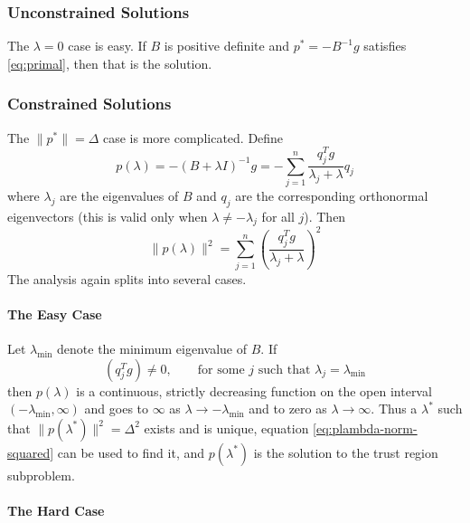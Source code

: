 \documentclass[11pt]{article}
\begin{document}
\subsubsection{Unconstrained Solutions}

The $\lambda = 0$ case is easy.  If $B$ is positive definite and
$p^* = - B^{-1} g$ satisfies \eqref{eq:primal}, then that is the solution.

\subsubsection{Constrained Solutions}

The $\lVert p^* \rVert = \Delta$ case is more complicated.  Define
\begin{equation} \label{eq:plambda}
   p(\lambda)
   =
   - (B + \lambda I)^{-1} g
   =
   - \sum_{j = 1}^{n} \frac{q_j^T g}{\lambda_j + \lambda} q_j
\end{equation}
where $\lambda_j$ are the eigenvalues of $B$ and $q_j$ are the corresponding
orthonormal eigenvectors (this is valid only when $\lambda \neq - \lambda_j$
for all $j$).  Then
\begin{equation} \label{eq:plambda-norm-squared}
   \lVert p(\lambda) \rVert^2
   =
   \sum_{j = 1}^{n} \left( \frac{q_j^T g}{\lambda_j + \lambda} \right)^2
\end{equation}
The analysis again splits into several cases.

\paragraph{The Easy Case}

Let $\lambda_{\text{min}}$ denote the minimum eigenvalue of $B$.
If
\begin{equation} \label{eq:easy-condition}
   (q_j^T g) \neq 0, \qquad \text{for some $j$ such that
   $\lambda_j = \lambda_{\text{min}}$}
\end{equation}
then $p(\lambda)$ is a continuous, strictly decreasing function on
the open interval $(- \lambda_{\text{min}}, \infty)$ and goes to $\infty$
as $\lambda \to - \lambda_{\text{min}}$ and to zero as $\lambda \to \infty$.
Thus a $\lambda^*$
such that $\lVert p(\lambda^*) \rVert^2 = \Delta^2$ exists and is unique,
equation \eqref{eq:plambda-norm-squared} can be used to find it,
and $p(\lambda^*)$ is the
solution to the trust region subproblem.

\paragraph{The Hard Case}
\end{document}
